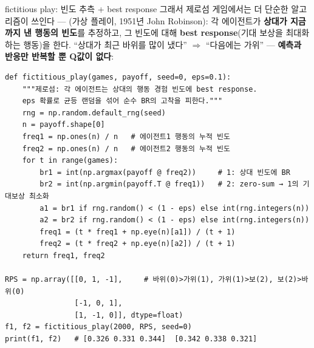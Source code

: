 \documentclass[aspectratio=169,11pt]{beamer}
\begin{document}
\begin{frame}[fragile]{fictitious play: 빈도 추측 + best response}
  그래서 제로섬 게임에서는 더 단순한 알고리즘이 쓰인다 ---
  (가상 플레이, 1951년 John Robinson):
  각 에이전트가 \textbf{상대가 지금까지 낸 행동의 빈도}를
  추정하고, 그 빈도에 대해 \textbf{best response}(기대 보상을
  최대화하는 행동)을 한다. ``상대가 최근 바위를 많이 냈다''
  $\Rightarrow$ ``다음에는 가위'' --- \textbf{예측과 반응만
  반복할 뿐 Q값이 없다}:
\begin{lstlisting}
def fictitious_play(games, payoff, seed=0, eps=0.1):
    """제로섬: 각 에이전트는 상대의 행동 경험 빈도에 best response.
    eps 확률로 균등 랜덤을 섞어 순수 BR의 고착을 피한다."""
    rng = np.random.default_rng(seed)
    n = payoff.shape[0]
    freq1 = np.ones(n) / n   # 에이전트1 행동의 누적 빈도
    freq2 = np.ones(n) / n   # 에이전트2 행동의 누적 빈도
    for t in range(games):
        br1 = int(np.argmax(payoff @ freq2))     # 1: 상대 빈도에 BR
        br2 = int(np.argmin(payoff.T @ freq1))   # 2: zero-sum → 1의 기대보상 최소화
        a1 = br1 if rng.random() < (1 - eps) else int(rng.integers(n))
        a2 = br2 if rng.random() < (1 - eps) else int(rng.integers(n))
        freq1 = (t * freq1 + np.eye(n)[a1]) / (t + 1)
        freq2 = (t * freq2 + np.eye(n)[a2]) / (t + 1)
    return freq1, freq2

RPS = np.array([[0, 1, -1],     # 바위(0)>가위(1), 가위(1)>보(2), 보(2)>바위(0)
                [-1, 0, 1],
                [1, -1, 0]], dtype=float)
f1, f2 = fictitious_play(2000, RPS, seed=0)
print(f1, f2)   # [0.326 0.331 0.344]  [0.342 0.338 0.321]
\end{lstlisting}
\end{frame}

\end{document}
